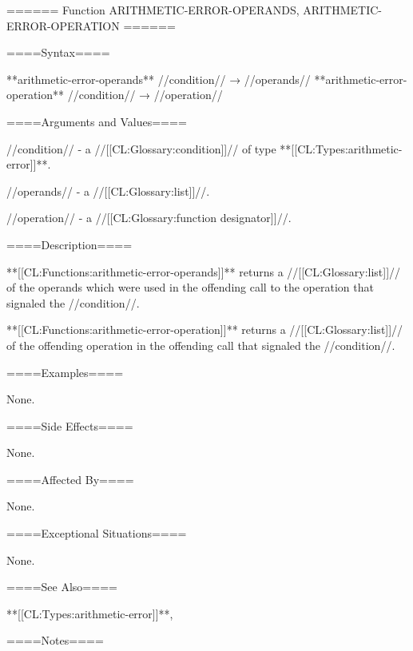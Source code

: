 ====== Function ARITHMETIC-ERROR-OPERANDS, ARITHMETIC-ERROR-OPERATION ======

====Syntax====

**arithmetic-error-operands** //condition// → //operands// **arithmetic-error-operation** //condition// → //operation//

====Arguments and Values====

//condition// - a //[[CL:Glossary:condition]]// of type **[[CL:Types:arithmetic-error]]**.

//operands// - a //[[CL:Glossary:list]]//.

//operation// - a //[[CL:Glossary:function designator]]//.

====Description====

**[[CL:Functions:arithmetic-error-operands]]** returns a //[[CL:Glossary:list]]// of the operands which were used in the offending call to the operation that signaled the //condition//.

**[[CL:Functions:arithmetic-error-operation]]** returns a //[[CL:Glossary:list]]// of the offending operation in the offending call that signaled the //condition//.

====Examples====

None.

====Side Effects====

None.

====Affected By====

None.

====Exceptional Situations====

None.

====See Also====

**[[CL:Types:arithmetic-error]]**,{\chapref\Conditions}

====Notes====

